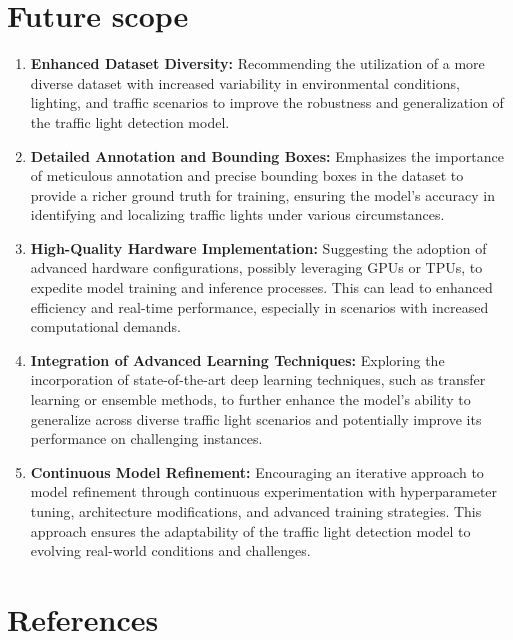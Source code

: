 \documentclass[12 pt]{report}
\begin{document}
\section{Future scope}
\begin{justify}
\begin{enumerate}
    \item \textbf{Enhanced Dataset Diversity:}
    Recommending the utilization of a more diverse dataset with increased variability in environmental conditions, lighting, and traffic scenarios to improve the robustness and generalization of the traffic light detection model.
    \item \textbf{Detailed Annotation and Bounding Boxes:}
    Emphasizes the importance of meticulous annotation and precise bounding boxes in the dataset to provide a richer ground truth for training, ensuring the model's accuracy in identifying and localizing traffic lights under various circumstances.
    \item \textbf{High-Quality Hardware Implementation:}
    Suggesting the adoption of advanced hardware configurations, possibly leveraging GPUs or TPUs, to expedite model training and inference processes. This can lead to enhanced efficiency and real-time performance, especially in scenarios with increased computational demands.
    \item \textbf{Integration of Advanced Learning Techniques:}
    Exploring the incorporation of state-of-the-art deep learning techniques, such as transfer learning or ensemble methods, to further enhance the model's ability to generalize across diverse traffic light scenarios and potentially improve its performance on challenging instances.
    \item \textbf{Continuous Model Refinement:}
    Encouraging an iterative approach to model refinement through continuous experimentation with hyperparameter tuning, architecture modifications, and advanced training strategies. This approach ensures the adaptability of the traffic light detection model to evolving real-world conditions and challenges.
\end{enumerate}
\end{justify}
\newpage
\section*{References}
\end{document}
